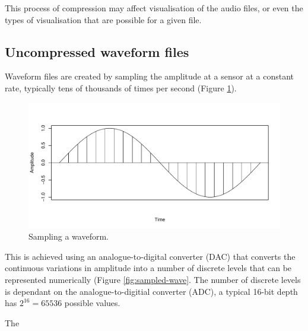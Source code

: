 \documentclass[
]{book}
\begin{document}
This process of compression may affect visualisation of the audio files, or even the types of visualisation that are possible for a given file.

\hypertarget{uncompressed-waveform-files}{%
\subsection{Uncompressed waveform files}\label{uncompressed-waveform-files}}

Waveform files are created by sampling the amplitude at a sensor at a constant rate, typically tens of thousands of times per second (Figure \ref{fig:wave-sampling}).

\begin{figure}

{\centering \includegraphics[width=0.9\linewidth]{_main_files/figure-latex/wave-sampling-1} 

}

\caption{Sampling a waveform.}\label{fig:wave-sampling}
\end{figure}

This is achieved using an analogue-to-digital converter (DAC) that converts the continuous variations in amplitude into a number of discrete levels that can be represented numerically (Figure \ref{fig:sampled-wave}. The number of discrete levels is dependant on the analogue-to-digitial converter (ADC), a typical 16-bit depth has \(2^{16}=65536\) possible values.

The
\end{document}
